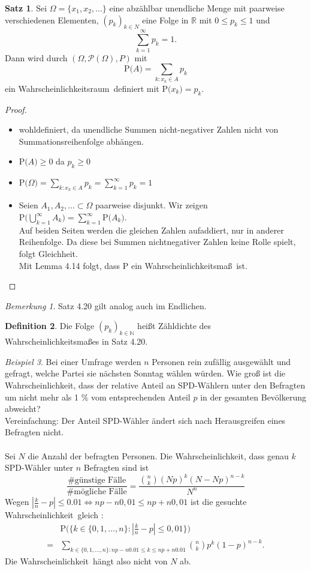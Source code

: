 \documentclass[a4paper,12pt,fleqn]{scrartcl}
\newcommand{\N}{\mathbb{N}}
\newcommand{\R}{\mathbb{R}}
\newcommand{\m}[1]{\mathcal{ #1 }}
\newcommand{\p}[1]{\text{P(} #1 \text{)}}
\newcommand{\WR}{Wahrscheinlichkeitsraum}
\newcommand{\WM}{Wahrscheinlichkeitsmaß}
\newcommand{\Wk}{Wahrscheinlichkeit}
\theoremstyle{definition}
\newtheorem{definition}{Definition}[section]
\newtheorem{satz}[definition]{Satz}
\theoremstyle{plain}
\theoremstyle{remark}
\newtheorem*{bemerkung}{Bemerkung}
\newtheorem{beispiel}[definition]{Beispiel}
\begin{document}
\begin{satz}
Sei $\Omega = \{ x_1,x_2,... \}$ eine abzählbar unendliche Menge mit paarweise verschiedenen Elementen, $(p_k)_{k \in N}$ eine Folge in $\R$ mit $0 \leq p_k \leq 1$ und
\[\sum_{k=1}^{\infty}{p_k} = 1.\]	 
Dann wird durch $( \Omega , \m{P}(\Omega)  , P)$ mit 
\[\p{A} = \sum_{k:x_k \in A}{p_k}\]
ein \WR \, definiert mit $\p{x_k} = p_k.$
\end{satz}
\begin{proof}
\begin{itemize}
\item wohldefiniert, da unendliche Summen nicht-negativer Zahlen nicht von Summationsreihenfolge abhängen.
\item $\p{A} \geq 0$ da $p_k \geq 0$
\item $\p{ \Omega } = \sum_{k:x_k \in A}{p_k} = \sum_{k=1}^{\infty}{p_k} = 1$
\item Seien $A_1, A_2,... \subset \Omega $ paarweise disjunkt. Wir zeigen $ \p{ \bigcup_{k=1}^{ \infty }{A_k} } = \sum_{k=1}^{\infty}{\p{A_k}}$.\\ 
Auf beiden Seiten werden die gleichen Zahlen aufaddiert, nur in anderer Reihenfolge. Da diese bei Summen nichtnegativer Zahlen keine Rolle spielt, folgt Gleichheit. \\
Mit Lemma 4.14 folgt, dass P ein \WM \, ist.
\end{itemize}
\end{proof}
\begin{bemerkung}
Satz 4.20 gilt analog auch im Endlichen.
\end{bemerkung}
\begin{definition}
Die Folge $(p_k)_{k \in \N}$ heißt Zähldichte des \WM es in Satz 4.20.
\end{definition}
\begin{beispiel}
Bei einer Umfrage werden $n$ Personen rein zufällig ausgewählt und gefragt, welche Partei sie nächsten Sonntag wählen würden. Wie groß ist die \Wk , dass der relative Anteil an SPD-Wählern unter den Befragten um nicht mehr als 1 \% vom entsprechenden Anteil $p$ in der gesamten Bevölkerung abweicht? \\
Vereinfachung: Der Anteil SPD-Wähler ändert sich nach Herausgreifen eines Befragten nicht. \\ \\
Sei $N$ die Anzahl der befragten Personen. Die \Wk , dass genau $k$ SPD-Wähler unter $n$ Befragten sind ist
\[\frac{\text{\# günstige Fälle}}{\text{\# mögliche Fälle}} = \frac{\binom{n}{k} (Np)^k (N-Np)^{n-k}}{N^n}\]
Wegen $|\frac{k}{n} - p | \leq 0.01 \iff np-n0,01 \leq np + n0,01$ ist die gesuchte \Wk \, gleich :
\begin{align*}
&\p{ \{ k \in \{ 0,1, \ldots ,n \} : |\frac{k}{n} -p| \leq 0,01 \}} \\
=& \sum_{k \in \{ 0,1, \ldots ,n \}: np-n0.01 \leq k \leq np+n0.01}{  \binom{n}{k} p^k (1-p)^{n-k}}.
\end{align*}
Die \Wk \, hängt also nicht von $N$ ab.
\end{beispiel}
\end{document}
